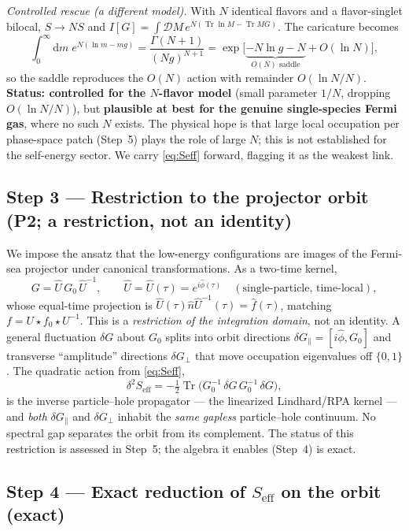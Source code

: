 \documentclass[11pt]{article}
\theoremstyle{remark}
\begin{document}
\medskip
\noindent\emph{Controlled rescue (a different model).} With $N$ identical flavors and a
flavor-singlet bilocal, $S\to N S$ and $I[G]=\int\mathcal{D}M\,e^{N(\operatorname{Tr}\ln M
-\operatorname{Tr}MG)}$. The caricature becomes
\[
\int_0^\infty\!\mathrm{d}m\;e^{N(\ln m-mg)}=\frac{\Gamma(N+1)}{(Ng)^{N+1}}
=\exp\!\big[\underbrace{-N\ln g-N}_{O(N)\text{ saddle}}+O(\ln N)\big],
\]
so the saddle reproduces the $O(N)$ action with remainder $O(\ln N/N)$. \textbf{Status:
controlled for the $N$-flavor model} (small parameter $1/N$, dropping $O(\ln N/N)$),
but \textbf{plausible at best for the genuine single-species Fermi gas}, where no such
$N$ exists. The physical hope is that large local occupation per phase-space patch (Step~5)
plays the role of large $N$; this is not established for the self-energy sector. We carry
\eqref{eq:Seff} forward, flagging it as the weakest link.

\subsection*{Step 3 --- Restriction to the projector orbit (P2; a restriction, not an identity)}

We impose the ansatz that the low-energy configurations are images of the Fermi-sea
projector under canonical transformations. As a two-time kernel,
\begin{equation}
\label{eq:orbitansatz}
G=\hat U\,G_0\,\hat U^{-1},
\qquad \hat U=\hat U(\tau)=e^{i\hat\phi(\tau)}\quad(\text{single-particle, time-local}),
\end{equation}
whose equal-time projection is $\hat U(\tau)\hat n\hat U^{-1}(\tau)=\hat f(\tau)$, matching
$f=U\star f_0\star U^{-1}$. This is a \emph{restriction of the integration domain}, not an
identity. A general fluctuation $\delta G$ about $G_0$ splits into orbit directions
$\delta G_\parallel=[i\hat\phi,G_0]$ and transverse ``amplitude'' directions
$\delta G_\perp$ that move occupation eigenvalues off $\{0,1\}$. The quadratic action from
\eqref{eq:Seff},
\[
\delta^2 S_{\mathrm{eff}}=-\tfrac12\operatorname{Tr}\!\big(G_0^{-1}\,\delta G\,G_0^{-1}\,\delta G\big),
\]
is the inverse particle--hole propagator --- the linearized Lindhard/RPA kernel --- and
\emph{both} $\delta G_\parallel$ and $\delta G_\perp$ inhabit the \emph{same gapless}
particle--hole continuum. No spectral gap separates the orbit from its complement. The
status of this restriction is assessed in Step~5; the algebra it enables (Step~4) is exact.

\subsection*{Step 4 --- Exact reduction of $S_{\mathrm{eff}}$ on the orbit (exact)}
\end{document}
